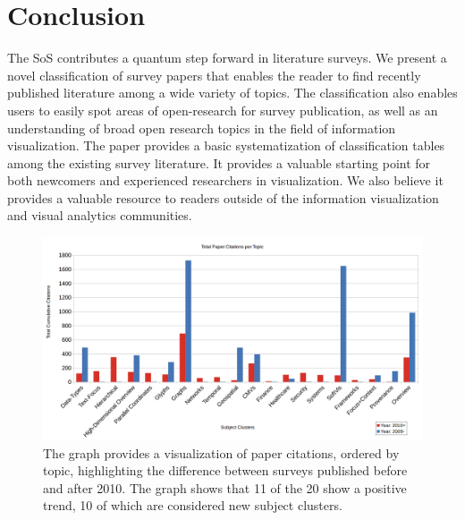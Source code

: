 \section{Conclusion}
The SoS contributes a quantum step forward in literature surveys. We present a novel classification of survey papers that enables the reader to find recently published literature among a wide variety of topics. The classification also enables users to easily spot areas of open-research for survey publication, as well as an understanding of broad open research topics in the field of information visualization. The paper provides a basic systematization of classification tables among the existing survey literature. It provides a valuable starting point for both newcomers and experienced researchers in visualization. We also believe it provides a valuable resource to readers outside of the information visualization and visual analytics communities. 


\begin{figure}[t]
\begin{center}
\includegraphics[width=1\textwidth]{images/CitedVis}
\caption{The graph provides a visualization of paper citations, ordered by topic, highlighting the difference between surveys published before and after 2010. The graph shows that 11 of the 20 show a positive trend, 10 of which are considered new subject clusters.} \label{fig: cited}
\end{center}
\end{figure}